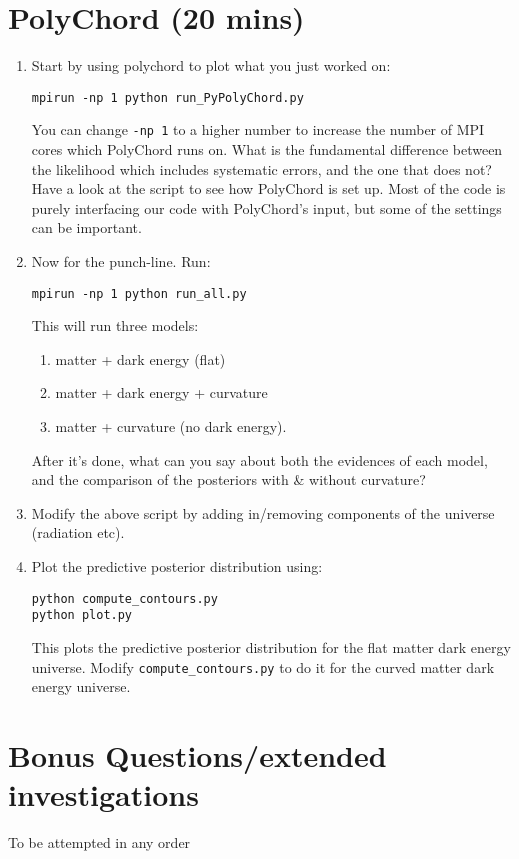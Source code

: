 \documentclass{article}
\begin{document}
\section{PolyChord (20 mins)}
\begin{enumerate}[resume]
    \item Start by using polychord to plot what you just worked on:
        \begin{lstlisting}
mpirun -np 1 python run_PyPolyChord.py
        \end{lstlisting}
        You can change \lstinline{-np 1} to a higher number to increase the number of MPI cores which PolyChord runs on. What is the fundamental difference between the likelihood which includes systematic errors, and the one that does not? Have a look at the script to see how PolyChord is set up. Most of the code is purely interfacing our code with PolyChord's input, but some of the settings can be important.
    \item Now for the punch-line. Run:
        \begin{lstlisting}
mpirun -np 1 python run_all.py
        \end{lstlisting}
        This will run three models:
        \begin{enumerate}
            \item matter + dark energy (flat)
            \item matter + dark energy + curvature
            \item matter + curvature (no dark energy).
        \end{enumerate}
        After it's done, what can you say about both the evidences of each model, and the comparison of the posteriors with \& without curvature?
    \item Modify the above script by adding in/removing components of the universe (radiation etc).

    \item Plot the predictive posterior distribution using:
        \begin{lstlisting}
python compute_contours.py
python plot.py
        \end{lstlisting}
        This plots the predictive posterior distribution for the flat matter dark energy universe. Modify \lstinline{compute_contours.py} to do it for the curved matter dark energy universe.
\end{enumerate}

\section{Bonus Questions/extended investigations}
To be attempted in any order
\end{document}
